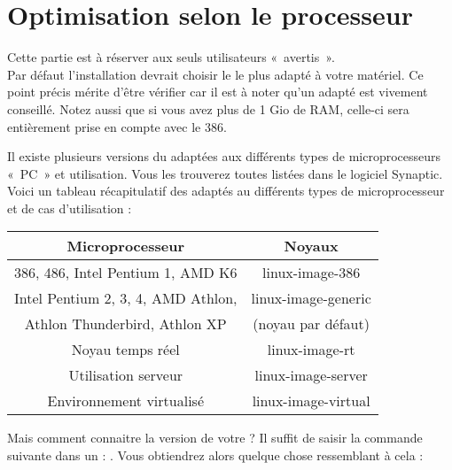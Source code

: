 \section{Optimisation selon le processeur}
Cette partie est à réserver aux seuls utilisateurs «~avertis~».\\
Par défaut l'installation devrait choisir le  le plus adapté à votre matériel. Ce point précis mérite d'être vérifier car il est à noter qu'un  adapté est vivement conseillé. Notez aussi que si vous avez plus de 1 Gio de RAM, celle-ci sera entièrement prise en compte avec le  386.\par
Il existe plusieurs versions du  adaptées aux différents types de microprocesseurs «~PC~» et utilisation. Vous les trouverez toutes listées dans le logiciel Synaptic. Voici un tableau récapitulatif des  adaptés au différents types de microprocesseur et de cas d'utilisation :\par
\renewcommand{\multirowsetup}{\centering}
\begin{center}
\begin{tabular}{||c|c||}
\hline
\hline
Microprocesseur & Noyaux\\
\hline
\hline
386, 486, Intel Pentium 1, AMD K6 & linux-image-386\\
\hline
Intel Pentium 2, 3, 4, AMD Athlon,& linux-image-generic\\
Athlon Thunderbird, Athlon XP & (noyau par défaut)\\
\hline
Noyau temps réel & linux-image-rt\\
\hline
Utilisation serveur & linux-image-server\\
\hline
Environnement virtualisé & linux-image-virtual\\
\hline
\hline
\end{tabular}
\end{center}\par
Mais comment connaitre la version de votre  ? Il suffit de saisir la commande suivante dans un  : . Vous obtiendrez alors quelque chose ressemblant à cela : 
